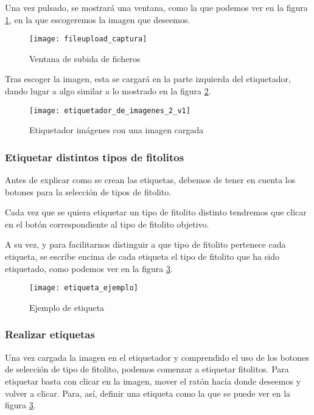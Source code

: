 Una vez  pulsado, se mostrará una ventana, como la que podemos ver en la figura \ref{fig:E.4.4}, en la que escogeremos la imagen que deseemos.

\begin{figure}[h]
\centering
\texttt{[image: fileupload\_captura]}
\caption{Ventana de subida de ficheros}
\label{fig:E.4.4}
\end{figure}

Tras escoger la imagen, esta se cargará en la parte izquierda del etiquetador, dando lugar a algo similar a lo mostrado en la figura \ref{fig:E.4.5}.

\begin{figure}[h]
\centering
\texttt{[image: etiquetador\_de\_imagenes\_2\_v1]}
\caption{Etiquetador imágenes con una imagen cargada}
\label{fig:E.4.5}
\end{figure}

\subsubsection{Etiquetar distintos tipos de fitolitos}
Antes de explicar como se crean las etiquetas, debemos de tener en cuenta los botones para la selección de tipos de fitolito.

Cada vez que se quiera etiquetar un tipo de fitolito distinto tendremos que clicar en el botón correspondiente al tipo de fitolito objetivo.

A su vez, y para facilitarnos distinguir a que tipo de fitolito pertenece cada etiqueta, se escribe encima de cada etiqueta el tipo de fitolito que ha sido etiquetado, como podemos ver en la figura \ref{fig:E.4.6}.

\begin{figure}[h]
\centering
\texttt{[image: etiqueta\_ejemplo]}
\caption{Ejemplo de etiqueta}
\label{fig:E.4.6}
\end{figure}

\subsubsection{Realizar etiquetas}

Una vez cargada la imagen en el etiquetador y comprendido el uso de los botones de selección de tipo de fitolito, podemos comenzar a  etiquetar fitolitos. Para etiquetar basta con clicar en la imagen, mover el ratón hacía donde deseemos y volver a clicar. Para, así, definir una etiqueta como la que se puede ver en la figura \ref{fig:E.4.6}.


